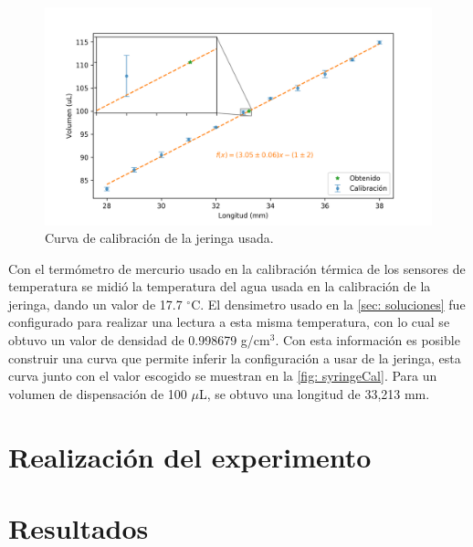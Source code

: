 		\begin{figure}[h]
			\centering
			\includegraphics[width=\linewidth]{../Data/Syringe/syringe_cal.png}
			\caption{Curva de calibraci\'on de la jeringa usada.}
			\label{fig: syringeCal}
		\end{figure}
	
		Con el termómetro de mercurio usado en la calibración térmica de los sensores de temperatura se midió la temperatura del agua usada en la calibración de la jeringa, dando un valor de 17.7 $^\circ$C. El densimetro usado en la \autoref{sec: soluciones} fue configurado para realizar una lectura a esta misma temperatura, con lo cual se obtuvo un valor de densidad de 0.998679 g/cm$^3$. Con esta información es posible construir una curva que permite inferir la configuración a usar de la jeringa, esta curva junto con el valor escogido se muestran en la \autoref{fig: syringeCal}. Para un volumen de dispensación de 100 $\mu$L, se obtuvo una longitud de 33,213 mm.
		\newline
	
\section{Realizaci\'on del experimento}

\section{Resultados}


		